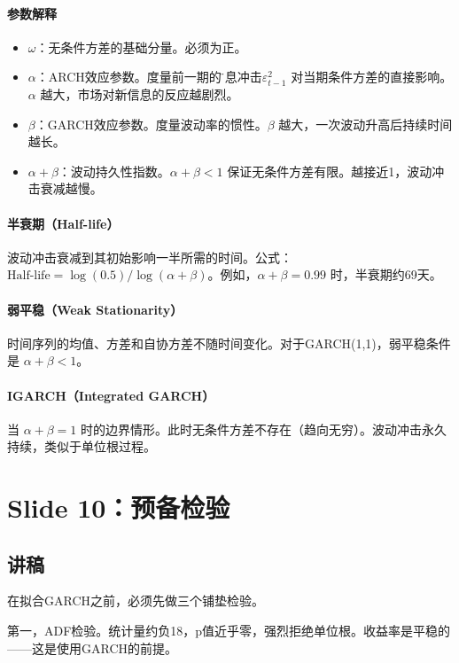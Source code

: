 \documentclass[11pt,a4paper]{article}
\begin{document}
\paragraph{参数解释}
\begin{itemize}[nosep]
\item \(\omega\)：无条件方差的基础分量。必须为正。
\item \(\alpha\)：ARCH效应参数。度量前一期的\"新息冲击\" \(\varepsilon_{t-1}^2\) 对当期条件方差的直接影响。\(\alpha\) 越大，市场对新信息的反应越剧烈。
\item \(\beta\)：GARCH效应参数。度量波动率的惯性。\(\beta\) 越大，一次波动升高后持续时间越长。
\item \(\alpha + \beta\)：波动持久性指数。\(\alpha + \beta < 1\) 保证无条件方差有限。越接近1，波动冲击衰减越慢。
\end{itemize}

\paragraph{半衰期（Half-life）} 波动冲击衰减到其初始影响一半所需的时间。公式：\(\text{Half-life} = \log(0.5) / \log(\alpha + \beta)\)。例如，\(\alpha + \beta = 0.99\) 时，半衰期约69天。

\paragraph{弱平稳（Weak Stationarity）} 时间序列的均值、方差和自协方差不随时间变化。对于GARCH(1,1)，弱平稳条件是 \(\alpha + \beta < 1\)。

\paragraph{IGARCH（Integrated GARCH）} 当 \(\alpha + \beta = 1\) 时的边界情形。此时无条件方差不存在（趋向无穷）。波动冲击永久持续，类似于单位根过程。

\newpage
\section*{Slide 10：预备检验}

\subsection*{讲稿}
在拟合GARCH之前，必须先做三个铺垫检验。

第一，ADF检验。统计量约负18，p值近乎零，强烈拒绝单位根。收益率是平稳的——这是使用GARCH的前提。
\end{document}
